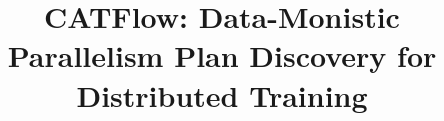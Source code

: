 \documentclass[letterpaper,twocolumn,10pt]{article}
\newcommand{\name}{CATFlow}
\begin{document}

\date{}

\title{\Large \bf \name{}: Data-Monistic Parallelism Plan Discovery for Distributed Training
}

\author{
\vspace{-2em}
} %

\maketitle
\end{document}
